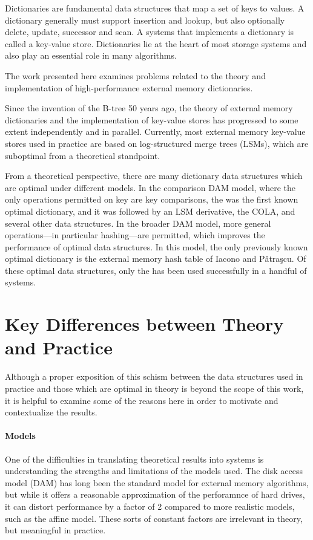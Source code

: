 Dictionaries are fundamental data structures that map a set of keys to values.
A dictionary generally must support insertion and lookup, but also optionally
delete, update, successor and scan. A systems that implements a dictionary is
called a key-value store. Dictionaries lie at the heart of most storage systems
and also play an essential role in many algorithms.

The work presented here examines problems related to the theory and
implementation of high-performance external memory dictionaries.

Since the invention of the B-tree 50 years ago, the theory of external memory
dictionaries and the implementation of key-value stores has progressed to some
extent independently and in parallel. Currently, most external memory key-value
stores used in practice are based on log-structured merge trees (LSMs), which
are suboptimal from a theoretical standpoint.

From a theoretical perspective, there are many dictionary data structures which
are optimal under different models. In the comparison DAM model, where the only
operations permitted on key are key comparisons, the \bet was the first known
optimal dictionary, and it was followed by an LSM derivative, the COLA, and
several other data structures. In the broader DAM model, more general
operations---in particular hashing---are permitted, which improves the
performance of optimal data structures. In this model, the only previously
known optimal dictionary is the external memory hash table of Iacono and
P\v{a}tra\c{s}cu. Of these optimal data structures, only the \bet has been used
successfully in a handful of systems.

\section{Key Differences between Theory and Practice}

Although a proper exposition of this schism between the data structures used in
practice and those which are optimal in theory is beyond the scope of this
work, it is helpful to examine some of the reasons here in order to motivate
and contextualize the results.

\paragraph{Models}
One of the difficulties in translating theoretical results into systems is
understanding the strengths and limitations of the models used. The disk access
model (DAM) has long been the standard model for external memory algorithms,
but while it offers a reasonable approximation of the perforamnce of hard
drives, it can distort performance by a factor of 2 compared to more realistic
models, such as the affine model. These sorts of constant factors are
irrelevant in theory, but meaningful in practice.

